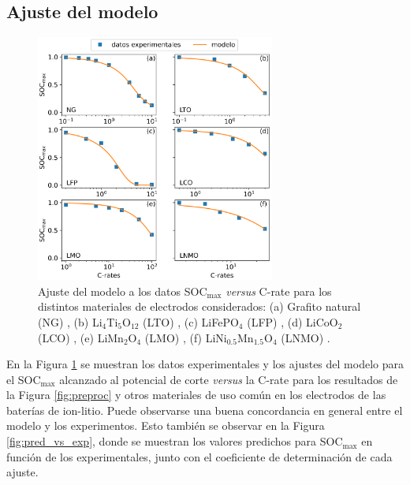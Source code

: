 \subsection{Ajuste del modelo}\label{s:ajustes}

\begin{figure}[t]
    \centering
    \includegraphics[width=0.7\textwidth]{FastCharging/un/resultados/ajuste/ajustes.png}
    \caption{Ajuste del modelo a los datos SOC$_{\max}$ \textit{versus} C-rate
    para los distintos materiales de electrodos considerados: (a) Grafito natural (NG)
    \cite{mancini2022}, (b) Li$_4$Ti$_5$O$_{12}$ (LTO) \cite{he2012}, (c) LiFePO$_4$ (LFP) \cite{lei2015}, 
    (d) LiCoO$_2$ (LCO) \cite{wang2019high}, (e) LiMn$_2$O$_4$ (LMO) \cite{bak2011}, (f) LiNi$_{0.5}$Mn$_{1.5}$O$_4$ (LNMO)
    \cite{nishikawa2017}.}
    \label{fig:ajustes}
\end{figure}

En la Figura \ref{fig:ajustes} se muestran los datos experimentales y los 
ajustes del modelo para el SOC$_{\max}$ alcanzado al potencial de corte 
\textit{versus} la C-rate para los resultados de la Figura \ref{fig:preproc}
y otros materiales de uso común en los electrodos de las baterías de ion-litio.
Puede observarse una buena concordancia en general entre el modelo y los 
experimentos. Esto también se observar en la Figura \ref{fig:pred_vs_exp},
donde se muestran los valores predichos para SOC$_{\max}$ en función de los
experimentales, junto con el coeficiente de determinación de cada ajuste.

